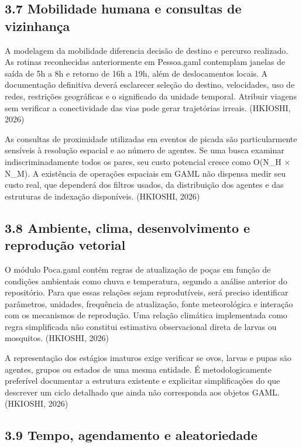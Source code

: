\subsection{3.7 Mobilidade humana e consultas de
vizinhança}\label{mobilidade-humana-e-consultas-de-vizinhanuxe7a}

A modelagem da mobilidade diferencia decisão de destino e percurso
realizado. As rotinas reconhecidas anteriormente em Pessoa.gaml
contemplam janelas de saída de 5h a 8h e retorno de 16h a 19h, além de
deslocamentos locais. A documentação definitiva deverá esclarecer
seleção do destino, velocidades, uso de redes, restrições geográficas e
o significado da unidade temporal. Atribuir viagens sem verificar a
conectividade das vias pode gerar trajetórias irreais. (HKIOSHI, 2026)

As consultas de proximidade utilizadas em eventos de picada são
particularmente sensíveis à resolução espacial e ao número de agentes.
Se uma busca examinar indiscriminadamente todos os pares, seu custo
potencial cresce como O(N\_H × N\_M). A existência de operações
espaciais em GAML não dispensa medir seu custo real, que dependerá dos
filtros usados, da distribuição dos agentes e das estruturas de
indexação disponíveis. (HKIOSHI, 2026)

\subsection{3.8 Ambiente, clima, desenvolvimento e reprodução
vetorial}\label{ambiente-clima-desenvolvimento-e-reproduuxe7uxe3o-vetorial}

O módulo Poca.gaml contém regras de atualização de poças em função de
condições ambientais como chuva e temperatura, segundo a análise
anterior do repositório. Para que essas relações sejam reprodutíveis,
será preciso identificar parâmetros, unidades, frequência de
atualização, fonte meteorológica e interação com os mecanismos de
reprodução. Uma relação climática implementada como regra simplificada
não constitui estimativa observacional direta de larvas ou mosquitos.
(HKIOSHI, 2026)

A representação dos estágios imaturos exige verificar se ovos, larvas e
pupas são agentes, grupos ou estados de uma mesma entidade. É
metodologicamente preferível documentar a estrutura existente e
explicitar simplificações do que descrever um ciclo detalhado que ainda
não corresponda aos objetos GAML. (HKIOSHI, 2026)

\subsection{3.9 Tempo, agendamento e
aleatoriedade}\label{tempo-agendamento-e-aleatoriedade}

